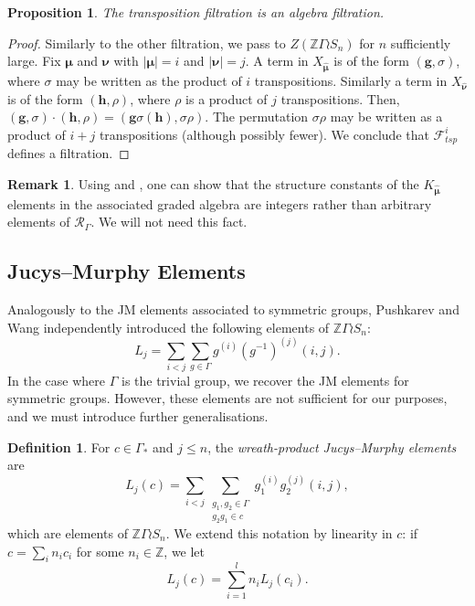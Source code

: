 \documentclass[10pt]{article}
\newtheorem{proposition}[theorem]{Proposition}
\theoremstyle{definition}
\newtheorem{definition}[theorem]{Definition}
\newtheorem{remark}[theorem]{Remark}
\newcommand{\bs}{\boldsymbol}
\newcommand{\RGamma}{\mathcal{R}_{\Gamma}}
\begin{document}
\begin{proposition} \label{length_filtration_prop}
The transposition filtration is an algebra filtration. \end{proposition}

\begin{proof}
Similarly to the other filtration, we pass to $Z(\mathbb{Z}\Gamma \wr S_n)$ for $n$ sufficiently large. Fix $\bs \mu$ and $\bs \nu$ with $|\bs \mu| = i$ and $|\bs \nu| = j$. A term in $X_{\bm\hat{\bs \mu}}$ is of the form $(\mathbf{g}, \sigma)$, where $\sigma$ may be written as the product of $i$ transpositions. Similarly a term in $X_{\bm\hat{\bs \nu}}$ is of the form $(\mathbf{h}, \rho)$, where $\rho$ is a product of $j$ transpositions. Then, $(\mathbf{g}, \sigma) \cdot (\mathbf{h}, \rho) = (\mathbf{g}\sigma(\mathbf{h}), \sigma\rho)$. The permutation $\sigma \rho$ may be written as a product of $i+j$ transpositions (although possibly fewer). We conclude that $\mathcal{F}_{tsp}^i$ defines a filtration.
\end{proof}

\begin{remark}
Using \cite[Lemma 3.2]{FarahatHigman} and \cite[Proposition 2.9]{Wang1}, one can show that the structure constants of the $K_{\bm\hat{\bs\mu}}$ elements in the associated graded algebra are integers rather than arbitrary elements of $\RGamma$. We will not need this fact.
\end{remark}




\subsection{Jucys--Murphy Elements}
Analogously to the JM elements associated to symmetric groups, Pushkarev \cite{Pushkarev} and Wang \cite{Wang2} independently introduced the following elements of $\mathbb{Z} \Gamma \wr S_n$:
\[
L_j =
\sum_{i<j} \sum_{g \in \Gamma} g^{(i)} (g^{-1})^{(j)} (i, j).
\]
In the case where $\Gamma$ is the trivial group, we recover the JM elements for symmetric groups. However, these elements are not sufficient for our purposes, and we must introduce further generalisations.

\begin{definition}
For $c \in \Gamma_*$ and $j \leq n$, the \emph{wreath-product Jucys--Murphy elements} are
\[
L_j(c) = \sum_{i < j} \sum_{\substack{g_1, g_2 \in \Gamma \\ g_2g_1 \in c}} g_1^{(i)} g_2^{(j)} (i, j),
\]
which are elements of $\mathbb{Z} \Gamma \wr S_n$. We extend this notation by linearity in $c$: if $c = \sum_i  n_i c_i$ for some $n_i \in \mathbb{Z}$, we let
\[
L_j(c) = \sum_{i=1}^l n_i L_j(c_i).
\]
\end{definition}
\end{document}
